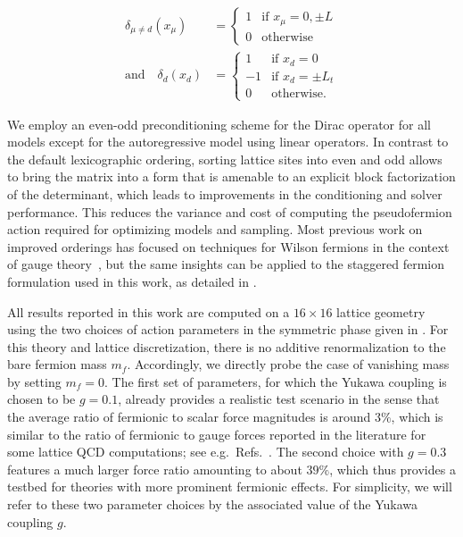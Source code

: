 \documentclass[aps,prd,twocolumn,nofootinbib,superscriptaddress,preprintnumbers]{revtex4-1}
\begin{document}
\begin{equation}
\begin{aligned}
  \delta_{\mu \neq d}(x_{\mu}) &=
  \begin{cases}
    1 & \text{if $x_\mu = 0, \pm L$} \\
    0 & \text{otherwise}
  \end{cases} \\
  \text{and} \quad
  \delta_d(x_d) &=
  \begin{cases}
    1 & \text{if $x_d = 0$} \\
    -1 & \text{if $x_d = \pm L_t$} \\
    0 & \text{otherwise.}
  \end{cases}
\end{aligned}
\end{equation}

We employ an even-odd preconditioning scheme for the Dirac operator for all models except for the autoregressive model using linear operators. In contrast to the default lexicographic ordering, sorting lattice sites into even and odd allows to bring the matrix into a form that is amenable to an explicit block factorization of the determinant, which leads to improvements in the conditioning and solver performance. This reduces the variance and cost of computing the pseudofermion action required for optimizing models and sampling. Most previous work on improved orderings has focused on techniques for Wilson fermions in the context of gauge theory~\cite{Frommer:1994vn,deForcrand:1996ck,Peardon:2000si}, but the same insights can be applied to the staggered fermion formulation used in this work, as detailed in .

All results reported in this work are computed on a $16 \times 16$ lattice geometry using the two choices of action parameters in the symmetric phase given in . For this theory and lattice discretization, there is no additive renormalization to the bare fermion mass $m_f$. Accordingly, we directly probe the case of vanishing mass by setting $m_f = 0$. The first set of parameters, for which the Yukawa coupling is chosen to be $g=0.1$, already provides a realistic test scenario in the sense that the average ratio of fermionic to scalar force magnitudes is around $3\%$, which is similar to the ratio of fermionic to gauge forces reported in the literature for some lattice QCD computations; see e.g.~Refs.~\cite{Luscher:2004pav,Urbach:2005ji}. The second choice with $g=0.3$ features a much larger force ratio amounting to about $39\%$, which thus provides a testbed for theories with more prominent fermionic effects. For simplicity, we will refer to these two parameter choices by the associated value of the Yukawa coupling $g$.
\end{document}
